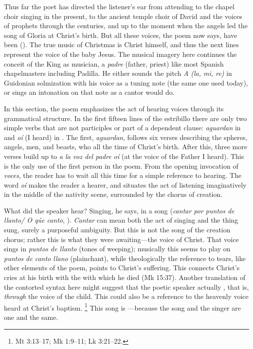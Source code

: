 Thus far the poet has directed the listener's ear from attending to the chapel
choir singing in the present, to the ancient temple choir of David and the
voices of prophets through the centuries, and up to the moment when the angels
led the song of Gloria at Christ's birth.
But all these voices, the poem now says, have been  ().
The true music of Christmas is Christ himself, and thus the next lines represent
the voice of the baby Jesus.
The musical imagery here continues the conceit of the King as musician, a
\emph{padre} (father, priest) like most Spanish chapelmasters including Padilla.
He either sounds the pitch \emph{A (la, mi, re)} in Guidonian solmization with
his voice as a tuning note (the same one used today), or sings an intonation on
that note as a cantor would do.

In this section, the poem emphasizes the act of hearing voices through its
grammatical structure.
In the first fifteen lines of the estribillo there are only two simple verbs
that are not participles or part of a dependent clause: \emph{aguardan} in
 and \emph{oí} (I heard) in .
The first, \emph{aguardan}, follows six verses describing the spheres, angels,
men, and beasts, who all  the time of Christ's birth.
After this, three more verses build up to \emph{a la voz del padre oí} (at the
voice of the Father I heard).
This is the only use of the first person in the poem.
From the opening invocation of \emph{voces}, the reader has to wait all this
time for a simple reference to hearing.
The word \emph{oí} makes the reader a hearer, and situates the act of listening
imaginatively in the middle of the nativity scene, surrounded by the chorus of
creation.

What did the speaker hear? 
Singing, he says, in a song (\emph{cantar por puntos de llanto/ O qúe canto},
).
\emph{Cantar} can mean both the act of singing and the thing sung, surely a
purposeful ambiguity.
But this is not the song of the creation chorus; rather this is what they were
awaiting---the voice of Christ.
That voice sings in \emph{puntos de llanto} (tones of weeping); musically this
seems to play on \emph{puntos de canto llano} (plainchant), while theologically
the reference to tears, like other elements of the poem, points to Christ's
suffering.
This connects Christ's cries at his birth with the  with
which he died (Mk 15:37).
Another translation of the contorted syntax here might suggest that the poetic
speaker actually , that is,
\emph{through} the voice of the child.
This could also be a reference to the heavenly voice heard at Christ's baptism.%
    \footnote{Mt 3:13--17; Mk 1:9--11; Lk 3:21--22.}
This song is ---because
the song and the singer are one and the same.

